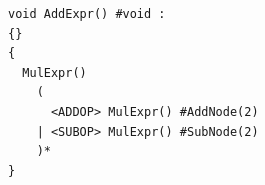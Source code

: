\documentclass[dvipdfmx]{jarticle}
\begin{document}
\begin{minipage}{0.6\textwidth}
\begin{Verbatim}[frame=single]
void AddExpr() #void :
{}
{
  MulExpr()
    (
      <ADDOP> MulExpr() #AddNode(2)
    | <SUBOP> MulExpr() #SubNode(2)
    )*
}
\end{Verbatim}
\end{minipage}
\end{document}

